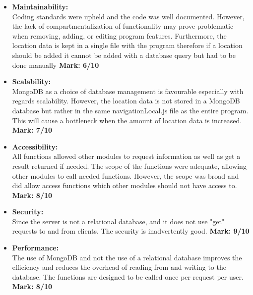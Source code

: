 \begin{itemize}
	
	\item \textbf{Maintainability:}\\Coding standards were upheld and the code was well documented. However, the lack of compartmentalization of functionality may prove problematic when  removing, adding, or editing program features. Furthermore, the location data is kept in a single file with the program therefore if a location should be added it cannot be added with a database query but had to be done manually \textbf{Mark: 6/10}
	\item \textbf{Scalability:}\\MongoDB as a choice of database management is favourable especially with regards scalability. However, the location data is not stored in a MongoDB database but rather in the same navigationLocal.js file as the entire program. This will cause a bottleneck when the amount of location data is increased. \textbf{Mark: 7/10}
	\item \textbf{Accessibility:}\\All functions allowed other modules to request information as well as get a result returned if needed. The scope of the functions were adequate, allowing other modules to call needed functions. However, the scope was broad and did allow access functions which other modules should not have access to. \textbf{Mark: 8/10}
	\item \textbf{Security:}\\Since the server is not a relational database, and it does not use "get" requests to and from clients. The security is inadvertently good. \textbf{Mark: 9/10}
	\item \textbf{Performance:}\\The use of MongoDB and not the use of a relational database improves the efficiency and reduces the overhead of reading from and writing to the database. The functions are designed to be called once per request per user. \textbf{Mark: 8/10}
	
\end{itemize}